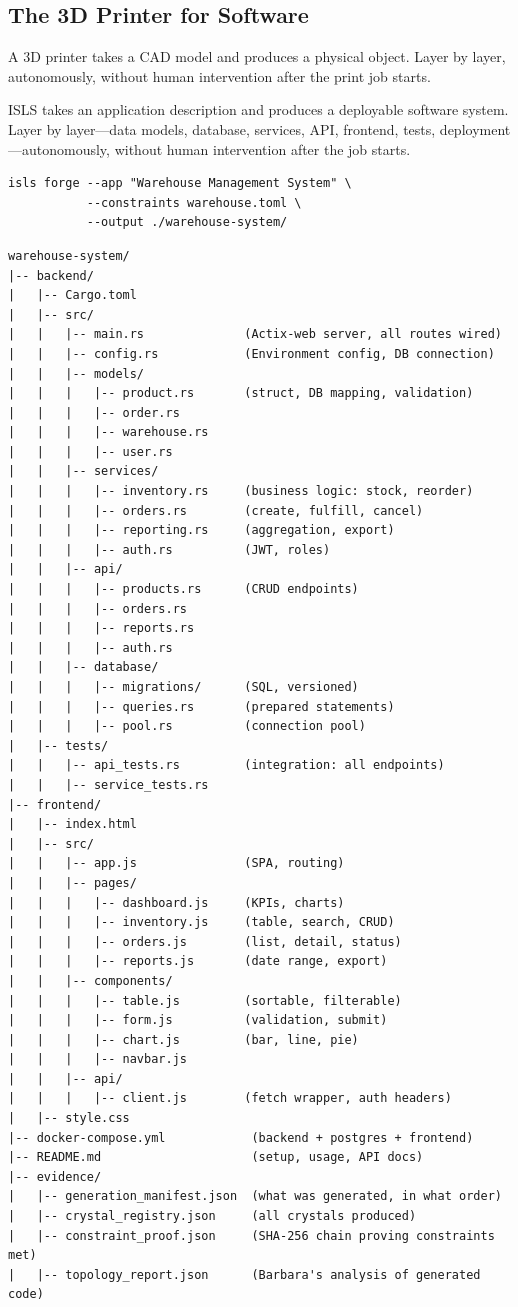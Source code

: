 \documentclass[11pt,a4paper]{article}
\begin{document}
\subsection{The 3D Printer for Software}

A 3D printer takes a CAD model and produces a physical object.
Layer by layer, autonomously, without human intervention after
the print job starts.

ISLS takes an application description and produces a deployable
software system. Layer by layer---data models, database, services,
API, frontend, tests, deployment---autonomously, without human
intervention after the job starts.

\begin{lstlisting}[title=The Input]
isls forge --app "Warehouse Management System" \
           --constraints warehouse.toml \
           --output ./warehouse-system/
\end{lstlisting}

\begin{lstlisting}[title=The Output (10 minutes later)]
warehouse-system/
|-- backend/
|   |-- Cargo.toml
|   |-- src/
|   |   |-- main.rs              (Actix-web server, all routes wired)
|   |   |-- config.rs            (Environment config, DB connection)
|   |   |-- models/
|   |   |   |-- product.rs       (struct, DB mapping, validation)
|   |   |   |-- order.rs
|   |   |   |-- warehouse.rs
|   |   |   |-- user.rs
|   |   |-- services/
|   |   |   |-- inventory.rs     (business logic: stock, reorder)
|   |   |   |-- orders.rs        (create, fulfill, cancel)
|   |   |   |-- reporting.rs     (aggregation, export)
|   |   |   |-- auth.rs          (JWT, roles)
|   |   |-- api/
|   |   |   |-- products.rs      (CRUD endpoints)
|   |   |   |-- orders.rs
|   |   |   |-- reports.rs
|   |   |   |-- auth.rs
|   |   |-- database/
|   |   |   |-- migrations/      (SQL, versioned)
|   |   |   |-- queries.rs       (prepared statements)
|   |   |   |-- pool.rs          (connection pool)
|   |-- tests/
|   |   |-- api_tests.rs         (integration: all endpoints)
|   |   |-- service_tests.rs
|-- frontend/
|   |-- index.html
|   |-- src/
|   |   |-- app.js               (SPA, routing)
|   |   |-- pages/
|   |   |   |-- dashboard.js     (KPIs, charts)
|   |   |   |-- inventory.js     (table, search, CRUD)
|   |   |   |-- orders.js        (list, detail, status)
|   |   |   |-- reports.js       (date range, export)
|   |   |-- components/
|   |   |   |-- table.js         (sortable, filterable)
|   |   |   |-- form.js          (validation, submit)
|   |   |   |-- chart.js         (bar, line, pie)
|   |   |   |-- navbar.js
|   |   |-- api/
|   |   |   |-- client.js        (fetch wrapper, auth headers)
|   |-- style.css
|-- docker-compose.yml            (backend + postgres + frontend)
|-- README.md                     (setup, usage, API docs)
|-- evidence/
|   |-- generation_manifest.json  (what was generated, in what order)
|   |-- crystal_registry.json     (all crystals produced)
|   |-- constraint_proof.json     (SHA-256 chain proving constraints met)
|   |-- topology_report.json      (Barbara's analysis of generated code)
\end{lstlisting}
\end{document}
